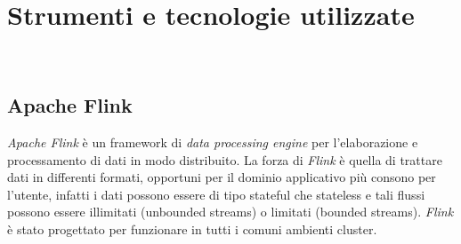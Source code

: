 
\chapter{Strumenti e tecnologie utilizzate}
\label{cap:strumenti-tecnologie}


\\

\section{Apache Flink}
\textit{Apache Flink} è un \gls{framework} di \textit{data processing engine} per l'elaborazione e processamento di dati in modo distribuito.
La forza di \textit{Flink} è quella di trattare dati in differenti formati, opportuni per il dominio applicativo più consono per l'utente, infatti i dati possono essere di tipo \gls{stateful} che \gls{stateless} e tali flussi possono essere illimitati (\gls{unbounded streams}) o limitati (\gls{bounded streams}). \textit{Flink} è stato progettato per funzionare in tutti i comuni ambienti \gls{cluster}.

